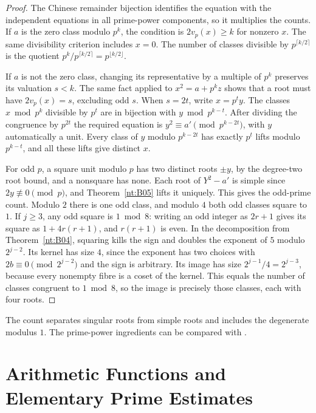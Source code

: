\documentclass[11pt,oneside,openany]{book}
\theoremstyle{plain}
\theoremstyle{definition}
\theoremstyle{remark}
\begin{document}
\begin{proof}
The Chinese remainder bijection identifies the equation with
the independent equations in all prime-power components,
so it multiplies the counts. If $a$ is the zero class modulo
$p^k$, the condition is $2v_p(x)\ge k$ for nonzero $x$.
The same divisibility criterion includes $x=0$. The number
of classes divisible by $p^{\lceil k/2\rceil}$ is the quotient
$p^k/p^{\lceil k/2\rceil}=p^{\lfloor k/2\rfloor}$.

If $a$ is not the zero class, changing its representative by
a multiple of $p^k$ preserves its valuation $s<k$. The
same fact applied to $x^2=a+p^k z$ shows that a root must
have $2v_p(x)=s$, excluding odd $s$. When $s=2t$, write
$x=p^t y$. The classes $x\bmod p^k$ divisible by $p^t$ are
in bijection with $y\bmod p^{k-t}$. After dividing the
congruence by $p^{2t}$ the required equation is
$y^2\equiv a'\pmod{p^{k-2t}}$, with $y$ automatically a unit.
Every class of $y$ modulo $p^{k-2t}$ has exactly $p^t$ lifts
modulo $p^{k-t}$, and all these lifts give distinct $x$.

For odd $p$, a square unit modulo $p$ has two distinct roots
$\pm y$, by the degree-two root bound, and a nonsquare has
none. Each root of $Y^2-a'$ is simple since $2y\not\equiv0\pmod p$,
and Theorem~\ref{nt:B05} lifts it uniquely. This gives the
odd-prime count. Modulo $2$ there is one odd class, and modulo
$4$ both odd classes square to $1$. If $j\ge3$, any odd
square is $1\bmod8$: writing an odd integer as $2r+1$ gives
its square as $1+4r(r+1)$, and $r(r+1)$ is even.
In the decomposition from Theorem~\ref{nt:B04}, squaring kills
the sign and doubles the exponent of $5$ modulo $2^{j-2}$.
Its kernel has size $4$, since the exponent has two choices
with $2b\equiv0\pmod{2^{j-2}}$ and the sign is arbitrary.
Its image has size $2^{j-1}/4=2^{j-3}$, because every
nonempty fibre is a coset of the kernel. This equals the
number of classes congruent to $1\bmod8$, so the image
is precisely those classes, each with four roots.
\end{proof}
The count separates singular roots from simple roots and includes
the degenerate modulus $1$. The prime-power ingredients can be
compared with \cite[\S\S5.9, 9.6, 10.11]{apostol}.
\chapter[Arithmetic functions and primes]{Arithmetic Functions and Elementary Prime Estimates}
\label{ch:arithmetic-functions}
\end{document}
